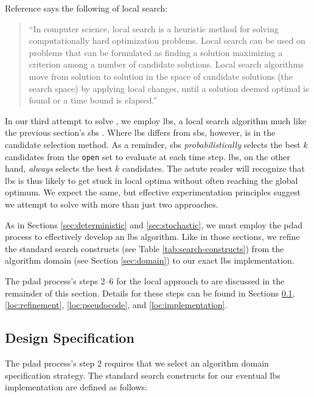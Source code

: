 \documentclass[../main.tex]{subfiles}
\begin{document}
Reference \cite{wikipedia:local-search} says the following of local search:

\begin{quote}
    ``In computer science, local search is a heuristic method for solving computationally hard optimization problems. Local search can be used on problems that can be formulated as finding a solution maximizing a criterion among a number of candidate solutions. Local search algorithms move from solution to solution in the space of candidate solutions (the search space) by applying local changes, until a solution deemed optimal is found or a time bound is elapsed.''
\end{quote}

In our third attempt to solve \prob, we employ \ac{lbs}, a local search algorithm much like the previous section's \acl{sbs} \cite{wikipedia:beam-search, Russell2009}. Where \ac{lbs} differs from \ac{sbs}, however, is in the candidate selection method. As a reminder, \ac{sbs} \textit{probabilistically} selects the best $k$ candidates from the \texttt{open} set to evaluate at each time step. \ac{lbs}, on the other hand, \textit{always} selects the best $k$ candidates. The astute reader will recognize that \ac{lbs} is thus likely to get stuck in local optima without often reaching the global optimum. We expect the same, but effective experimentation principles suggest we attempt to solve \probs with more than just two approaches.

As in Sections \ref{sec:deterministic} and \ref{sec:stochastic}, we must employ the \ac{pdad} process to effectively develop an \ac{lbs} algorithm. Like in those sections, we refine the standard search constructs (see Table \ref{tab:search-constructs}) from the algorithm domain (see Section \ref{sec:domain}) to our exact \ac{lbs} implementation.

The \ac{pdad} process's steps 2--6 for the local approach to \probs are discussed in the remainder of this section. Details for these steps can be found in Sections \ref{loc:specification}, \ref{loc:refinement}, \ref{loc:pseudocode}, and \ref{loc:implementation}.

\subsection{Design Specification}\label{loc:specification}

The \ac{pdad} process's step 2 requires that we select an algorithm domain specification strategy. The standard search constructs for our eventual \ac{lbs} implementation are defined as follows:
\end{document}
